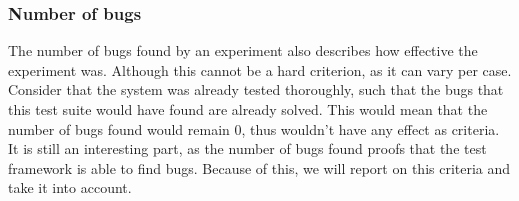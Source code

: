 \subsubsection{Number of bugs}
The number of bugs found by an experiment also describes how effective the
experiment was. Although this cannot be a hard criterion, as it can vary per
case. Consider that the system was already tested thoroughly, such that the bugs
that this test suite would have found are already solved. This would mean that
the number of bugs found would remain 0, thus wouldn't have any effect as
criteria. It is still an interesting part, as the number of bugs found proofs
that the test framework is able to find bugs. Because of this, we will report on
this criteria and take it into account.




